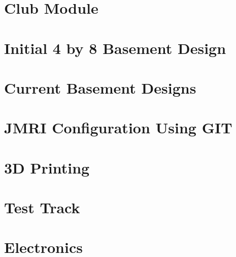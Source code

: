 \documentclass[12pt,twoside]{book}
\begin{document}
\frontmatter
\pagestyle{empty}


\dominitoc
\tableofcontents
\listoftables
\listoffigures

\mainmatter
\pagestyle{protocol}
\part{Club Module}



\part{Initial 4 by 8 Basement Design}


\part{Current Basement Designs}


\part{JMRI Configuration Using GIT}


\part{3D Printing}


\part{Test Track}


\part{Electronics}




\backmatter
{}
\footnotesize
\printindex
\normalsize
{}
\end{document}
